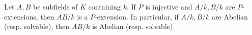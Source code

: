 Let $A, B$ be subfields of $K$ containing $k$. If $P$ is injective and $A/k, B/k$ are $P$-extensions, then $AB/k$ is a $P$-extension. In particular, if $A/k, B/k$ are Abelian (resp. solvable), then $AB/k$ is Abelian (resp. solvable).
